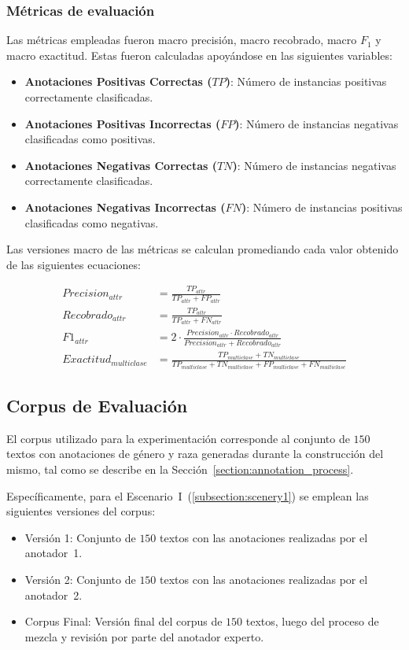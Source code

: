 \subsubsection{M\'etricas de evaluaci\'on}
Las m\'etricas empleadas fueron macro precisi\'on, macro recobrado, macro $F_1$ y 
macro exactitud. Estas fueron calculadas apoy\'andose en las siguientes variables: 

\begin{itemize}
    \item \textbf{Anotaciones Positivas Correctas ($TP$)}: N\'umero de instancias positivas correctamente clasificadas.
    \item \textbf{Anotaciones Positivas Incorrectas ($FP$)}: N\'umero de instancias negativas clasificadas como positivas.
    \item \textbf{Anotaciones Negativas Correctas ($TN$)}: N\'umero de instancias negativas correctamente clasificadas.
    \item \textbf{Anotaciones Negativas Incorrectas ($FN$)}: N\'umero de instancias positivas clasificadas como negativas.
\end{itemize}

Las versiones macro de las m\'etricas se calculan promediando cada valor obtenido de las siguientes ecuaciones:

\begin{align}
    Precision_{attr} &= \frac{TP_{attr}}{TP_{attr} + FP_{attr}}\\
    Recobrado_{attr} &= \frac{TP_{attr}}{TP_{attr} + FN_{attr}}\\
    F1_{attr} &= 2 \cdot \frac{{Precision_{attr}} \cdot {Recobrado_{attr}}}{{Precision_{attr}} + {Recobrado_{attr}}}\\
    Exactitud_{multiclase} &= \frac{TP_{multiclase} + TN_{multiclase}}{TP_{multiclase} + TN_{multiclase} + FP_{multiclase} + FN_{multiclase}}
\end{align}


\subsection{Corpus de Evaluaci\'on}
El corpus utilizado para la experimentaci\'on corresponde al conjunto de $150$ textos con anotaciones de g\'enero y raza
generadas durante la construcci\'on del mismo, tal como se describe en la Secci\'on~\ref{section:annotation_process}.

Espec\'ificamente, para el Escenario~I~(\ref{subsection:scenery1}) se emplean las siguientes versiones del corpus:
\begin{itemize}
    \item Versi\'on 1: Conjunto de $150$ textos con las anotaciones realizadas por el anotador~1.
    \item Versi\'on 2: Conjunto de $150$ textos con las anotaciones realizadas por el anotador~2.
    \item Corpus Final: Versi\'on final del corpus de $150$ textos, luego del proceso de mezcla y revisi\'on por parte 
    del anotador experto.
\end{itemize}

